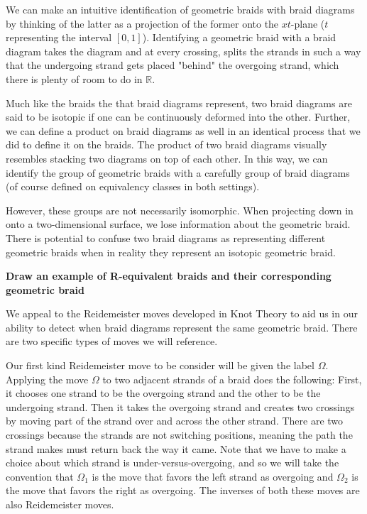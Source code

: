 \documentclass[10pt]{ucthesis}
\newcommand{\R}{\mathbb{R}}
\begin{document}
We can make an intuitive identification of geometric braids with braid diagrams by thinking of the latter as a projection of the former onto the $xt$-plane ($t$ representing the interval $[0,1]$). Identifying a geometric braid with a braid diagram takes the diagram and at every crossing, splits the strands in such a way that the undergoing strand gets placed "behind" the overgoing strand, which there is plenty of room to do in $\R$.

Much like the braids the that braid diagrams represent, two braid diagrams are said to be isotopic if one can be continuously deformed into the other. Further, we can define a product on braid diagrams as well in an identical process that we did to define it on the braids. The product of two braid diagrams visually resembles stacking two diagrams on top of each other. In this way, we can  identify the group of geometric braids with a carefully group of braid diagrams (of course defined on equivalency classes in both settings). 

However, these groups are not necessarily isomorphic. When projecting down in onto a two-dimensional surface, we lose information about the geometric braid. There is potential to confuse two braid diagrams as representing different geometric braids when in reality they represent an isotopic geometric braid.

\textbf{Draw an example of R-equivalent braids and their corresponding geometric braid}

We appeal to the Reidemeister moves developed in Knot Theory to aid us in our ability to detect when braid diagrams represent the same geometric braid. There are two specific types of moves we will reference.

Our first kind Reidemeister move to be consider will be given the label $\Omega$. Applying the move $\Omega$ to two adjacent strands of a braid does the following: First, it chooses one strand to be the overgoing strand and the other to be the undergoing strand. Then it takes the overgoing strand and creates two crossings by moving part of the strand over and across the other strand. There are two crossings because the strands are not switching positions, meaning the path the strand makes must return back the way it came. Note that we have to make a choice about which strand is under-versus-overgoing, and so we will take the convention that $\Omega_1$ is the move that favors the left strand as overgoing and $\Omega_2$ is the move that favors the right as overgoing. The inverses of both these moves are also Reidemeister moves.
\end{document}

